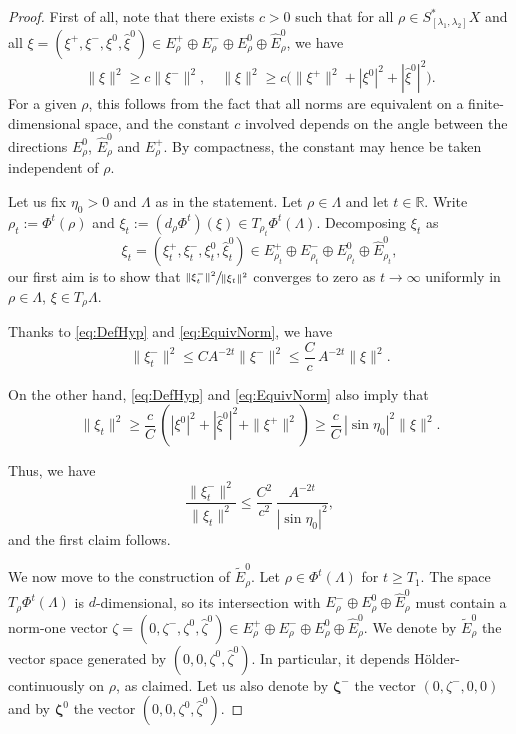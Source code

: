\documentclass[10pt]{amsart}
\theoremstyle{plain}
\theoremstyle{definition}
\newcommand{\R}{\mathbb{R}}
\begin{document}
\begin{proof}
First of all, note that there exists $c>0$ such that for all $\rho\in S^*_{[\lambda_1,\lambda_2]} X$ and all $\xi=(\xi^+,\xi^-,\xi^0, \hat{\xi}^0)\in E^+_{\rho}\oplus E^-_{\rho}\oplus E^0_{\rho}\oplus \hat{E}^0_{\rho}$, we have
\begin{equation}\label{eq:EquivNorm}
\|\xi\|^2 \geq c \|\xi^-\|^2,
\quad\|\xi\|^2 \geq c \bigl(\|\xi^+\|^2 + |\xi^0|^2 + |\hat{\xi}^0|^2 \bigl).
\end{equation}
For a given $\rho$, this follows from the fact that all norms are equivalent on a finite-dimensional space, and the constant $c$ involved depends on the angle between the directions $E^0_\rho$, $\hat{E}^0_\rho$ and $E^+_\rho$. By compactness, the constant may hence be taken independent of $\rho$.

Let us fix $\eta_0>0$ and $\Lambda$ as in the statement. Let $\rho\in \Lambda$ and let $t\in \R$. Write $\rho_t := \Phi^t(\rho)$ and $\xi_t := (d_\rho \Phi^t)(\xi)\in T_{\rho_t} \Phi^t(\Lambda)$. Decomposing $\xi_t$ as
\[
\xi_t=(\xi_t^+,\xi_t^-,\xi_t^0, \hat{\xi}_t^0)\in E^+_{\rho_t}\oplus E^-_{\rho_t}\oplus E^0_{\rho_t}\oplus \hat{E}^0_{\rho_t},
\]
our first aim is to show that $\sfrac{\|\xi_t^-\|^2}{\|\xi_t\|^2}$ converges to zero as $t\to \infty$ uniformly in $\rho\in \Lambda$, $\xi\in T_\rho \Lambda$.

Thanks to \eqref{eq:DefHyp} and \eqref{eq:EquivNorm}, we have
\[
\|\xi_t^-\|^2 \leq C A^{-2t} \|\xi^-\|^2 \leq \frac{C}{c}\, A^{-2t} \|\xi\|^2.
\]

On the other hand, \eqref{eq:DefHyp} and \eqref{eq:EquivNorm} also imply that
\[
\|\xi_t\|^2 \geq \frac{c}{C}\, (|\xi^0|^2+ |\hat{\xi}^0|^2 + \|\xi^+\|^2) \geq \frac{c}{C}\, |\sin \eta_0|^2 \|\xi\|^2.
\]

Thus, we have
\begin{equation}\label{eq:AlejandroTuDoisCandidater}
\frac{\|\xi_t^-\|^2}{\|\xi_t\|^2}\leq \frac{C^2}{c^2}\, \frac{A^{-2t}}{|\sin \eta_0|^2},
\end{equation}
and the first claim follows.

We now move to the construction of $\tilde{E}_\rho^0$. Let $\rho\in \Phi^t(\Lambda)$ for $t\geq T_1$. The space $T_\rho \Phi^t(\Lambda)$ is $d$-dimensional, so its intersection with $E^-_{\rho}\oplus E^0_{\rho}\oplus \hat{E}^0_{\rho}$ must contain a norm-one vector $\zeta=(0,\zeta^-, \zeta^0, \hat{\zeta}^0)\in E^+_{\rho}\oplus E^-_{\rho}\oplus E^0_{\rho}\oplus \hat{E}^0_{\rho}$. We denote by $\tilde{E}_\rho^0$ the vector space generated by $(0, 0, \zeta^0, \hat{\zeta}^0)$. In particular, it depends Hölder-continuously on $\rho$, as claimed. Let us also denote by $\boldsymbol{\zeta}^-$ the vector $(0,\zeta^-, 0, 0)$ and by $\boldsymbol{\zeta}^0$ the vector $(0, 0, \zeta^0, \hat{\zeta}^0)$.


\end{proof}
\end{document}
